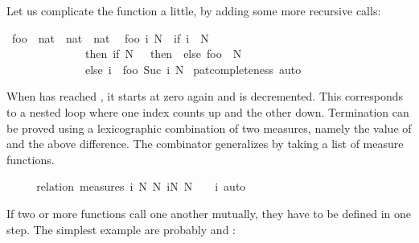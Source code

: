 \begin{isabellebody}
\begin{isamarkuptext}
  Let us complicate the function a little, by adding some more recursive calls:%
\end{isamarkuptext}%
\isamarkuptrue%
\isamarkupfalse%
\ foo\ {\isacharcolon}{\isacharcolon}\ {\isachardoublequoteopen}nat\ {\isasymRightarrow}\ nat\ {\isasymRightarrow}\ nat{\isachardoublequoteclose}\isanewline
{}\isanewline
\ \ {\isachardoublequoteopen}foo\ i\ N\ {\isacharequal}\ {\isacharparenleft}if\ i\ {\isachargreater}\ N\ \isanewline
\ \ \ \ \ \ \ \ \ \ \ \ \ \ then\ {\isacharparenleft}if\ N\ {\isacharequal}\ {}\ then\ {}\ else\ foo\ {}\ {\isacharparenleft}N\ {\isacharminus}\ {}{\isacharparenright}{\isacharparenright}\isanewline
\ \ \ \ \ \ \ \ \ \ \ \ \ \ else\ i\ {\isacharplus}\ foo\ {\isacharparenleft}Suc\ i{\isacharparenright}\ N{\isacharparenright}{\isachardoublequoteclose}\isanewline
%
\isadelimproof
%
\endisadelimproof
%
\isatagproof
{}\isamarkupfalse%
\ pat{\isacharunderscore}completeness\ auto%
\endisatagproof
{\isafoldproof}%
%
\isadelimproof
%
\endisadelimproof
%
\begin{isamarkuptext}%
When  has reached , it starts at zero again
  and  is decremented.
  This corresponds to a nested
  loop where one index counts up and the other down. Termination can
  be proved using a lexicographic combination of two measures, namely
  the value of  and the above difference. The 
  combinator generalizes  by taking a list of measure functions.%
\end{isamarkuptext}%
\isamarkuptrue%
\isamarkupfalse%
\ \isanewline
%
\isadelimproof
\ \ %
\endisadelimproof
%
\isatagproof
{}\isamarkupfalse%
\ {\isacharparenleft}relation\ {\isachardoublequoteopen}measures\ {\isacharbrackleft}{\isasymlambda}{\isacharparenleft}i{\isacharcomma}\ N{\isacharparenright}{\isachardot}\ N{\isacharcomma}\ {\isasymlambda}{\isacharparenleft}i{\isacharcomma}N{\isacharparenright}{\isachardot}\ N\ {\isacharplus}\ {}\ {\isacharminus}\ i{\isacharbrackright}{\isachardoublequoteclose}{\isacharparenright}\ auto%
\endisatagproof
{\isafoldproof}%
%
\isadelimproof
%
\endisadelimproof
%
\isamarkuptrue%
%
\begin{isamarkuptext}%
If two or more functions call one another mutually, they have to be defined
  in one step. The simplest example are probably  and :%
\end{isamarkuptext}%

\end{isabellebody}
